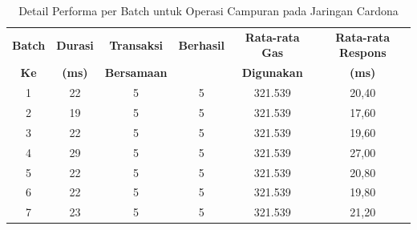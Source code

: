 \begin{table}[h!]
  \centering
  \begin{tabular}{|c|c|c|c|c|c|}
    \hline
    \textbf{Batch} & \textbf{Durasi} & \textbf{Transaksi} & \textbf{Berhasil} & \textbf{Rata-rata Gas} & \textbf{Rata-rata Respons} \\
    \textbf{Ke}    & \textbf{(ms)}   & \textbf{Bersamaan} & \textbf{}         & \textbf{Digunakan}     & \textbf{(ms)}              \\
    \hline
    1              & 22              & 5                  & 5                 & 321.539                & 20,40                      \\
    \hline
    2              & 19              & 5                  & 5                 & 321.539                & 17,60                      \\
    \hline
    3              & 22              & 5                  & 5                 & 321.539                & 19,60                      \\
    \hline
    4              & 29              & 5                  & 5                 & 321.539                & 27,00                      \\
    \hline
    5              & 22              & 5                  & 5                 & 321.539                & 20,80                      \\
    \hline
    6              & 22              & 5                  & 5                 & 321.539                & 19,80                      \\
    \hline
    7              & 23              & 5                  & 5                 & 321.539                & 21,20                      \\
    \hline
  \end{tabular}
  \caption{Detail Performa per Batch untuk Operasi Campuran pada Jaringan Cardona}
  \label{tab:mixed_operations_batches}
\end{table}
